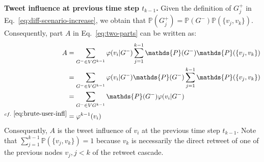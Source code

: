 \textbf{Tweet influence at previous time step $t_{k-1}$.}
Given the definition of $G_j^+$ in Eq.~\eqref{eq:diff-scenario-increase}, we obtain that $\mathds{P}(G_j^+) = \mathds{P}(G^-)\mathds{P}(\{v_j,v_k\})$.
Consequently, part $A$ in Eq.~\eqref{eq:two-parts} can be written as:
\begin{align}
	A 	&= \sum_{G^- \in {VG^{k-1}}} \varphi(v_i | G^-) \sum^{k-1}_{j=1} \mathds{P}(G^-)\mathds{P}(\{v_j,v_k\}) \nonumber \\
		&= \sum_{G^- \in {VG^{k-1}}} \varphi(v_i | G^-) \mathds{P}(G^-) \sum^{k-1}_{j=1} \mathds{P}(\{v_j,v_k\}) \nonumber \\
		&= \sum_{G^- \in {VG^{k-1}}} \mathds{P}(G^-) \varphi(v_i | G^-)  \nonumber \\
	^{cf.~\eqref{eq:brute-user-infl}}	&= \varphi^{k-1}(v_i) \label{eq:past-infl}
\end{align}
Consequently, $A$ is the tweet influence of $v_i$ at the previous time step $t_{k-1}$.
Note that $\sum^{k-1}_{j=1} \mathds{P}(\{v_j,v_k\}) = 1$ because $v_k$ is necessarily the direct retweet of one of the previous nodes $v_j, j < k$ of the retweet cascade.
%

